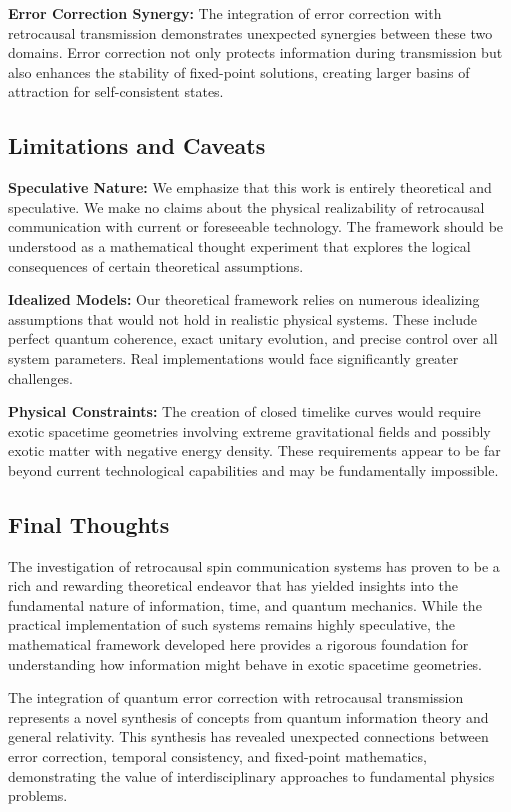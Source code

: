 \documentclass[12pt,a4paper]{article}
\begin{document}
\textbf{Error Correction Synergy:} The integration of error correction with retrocausal transmission demonstrates unexpected synergies between these two domains. Error correction not only protects information during transmission but also enhances the stability of fixed-point solutions, creating larger basins of attraction for self-consistent states.

\subsection{Limitations and Caveats}

\textbf{Speculative Nature:} We emphasize that this work is entirely theoretical and speculative. We make no claims about the physical realizability of retrocausal communication with current or foreseeable technology. The framework should be understood as a mathematical thought experiment that explores the logical consequences of certain theoretical assumptions.

\textbf{Idealized Models:} Our theoretical framework relies on numerous idealizing assumptions that would not hold in realistic physical systems. These include perfect quantum coherence, exact unitary evolution, and precise control over all system parameters. Real implementations would face significantly greater challenges.

\textbf{Physical Constraints:} The creation of closed timelike curves would require exotic spacetime geometries involving extreme gravitational fields and possibly exotic matter with negative energy density. These requirements appear to be far beyond current technological capabilities and may be fundamentally impossible.

\subsection{Final Thoughts}

The investigation of retrocausal spin communication systems has proven to be a rich and rewarding theoretical endeavor that has yielded insights into the fundamental nature of information, time, and quantum mechanics. While the practical implementation of such systems remains highly speculative, the mathematical framework developed here provides a rigorous foundation for understanding how information might behave in exotic spacetime geometries.

The integration of quantum error correction with retrocausal transmission represents a novel synthesis of concepts from quantum information theory and general relativity. This synthesis has revealed unexpected connections between error correction, temporal consistency, and fixed-point mathematics, demonstrating the value of interdisciplinary approaches to fundamental physics problems.
\end{document}
